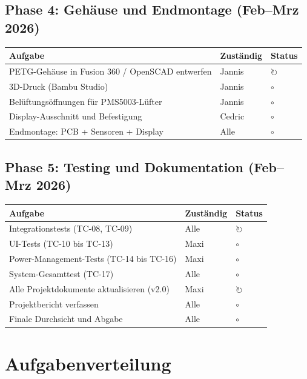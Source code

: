 \documentclass[a4paper,11pt]{article}
\begin{document}
\subsection{Phase 4: Gehäuse und Endmontage (Feb--Mrz 2026)}

\begin{tabularx}{\textwidth}{Xll}
\toprule
\rowcolor{tableheader}
\textbf{Aufgabe} & \textbf{Zuständig} & \textbf{Status} \\
\midrule
PETG-Gehäuse in Fusion 360 / OpenSCAD entwerfen & Jannis & $\circlearrowright$ \\
3D-Druck (Bambu Studio) & Jannis & $\circ$ \\
Belüftungsöffnungen für PMS5003-Lüfter & Jannis & $\circ$ \\
Display-Ausschnitt und Befestigung & Cedric & $\circ$ \\
Endmontage: PCB + Sensoren + Display & Alle & $\circ$ \\
\bottomrule
\end{tabularx}

\subsection{Phase 5: Testing und Dokumentation (Feb--Mrz 2026)}

\begin{tabularx}{\textwidth}{Xll}
\toprule
\rowcolor{tableheader}
\textbf{Aufgabe} & \textbf{Zuständig} & \textbf{Status} \\
\midrule
Integrationstests (TC-08, TC-09) & Alle & $\circlearrowright$ \\
UI-Tests (TC-10 bis TC-13) & Maxi & $\circ$ \\
Power-Management-Tests (TC-14 bis TC-16) & Maxi & $\circ$ \\
System-Gesamttest (TC-17) & Alle & $\circ$ \\
Alle Projektdokumente aktualisieren (v2.0) & Maxi & $\circlearrowright$ \\
Projektbericht verfassen & Alle & $\circ$ \\
Finale Durchsicht und Abgabe & Alle & $\circ$ \\
\bottomrule
\end{tabularx}

\section{Aufgabenverteilung}
\end{document}
